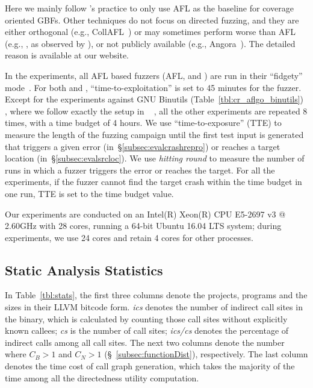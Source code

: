 Here we mainly follow \aflgo's practice to only use AFL as the baseline for coverage oriented GBFs. Other techniques do not focus on directed fuzzing, and they are either orthogonal (e.g., CollAFL~\cite{CollAFL}) or may sometimes perform worse than AFL (e.g., \aflfast, as observed by \cite{Shastry:LNCS2017:Orthrus}), or not publicly available (e.g., Angora~\cite{Angora}). The detailed reason is available at our website. %

In the experiments, all AFL based fuzzers (AFL, {\aflgo} and {\dGO}) are run in their ``fidgety'' mode~\cite{FidgetyAFL}. For both {\aflgo} and {\dGO}, ``time-to-exploitation'' is set to 45 minutes for the fuzzer. Except for the experiments against GNU Binutils (Table~\ref{tbl:cr_aflgo_binutils}) , where we follow exactly the setup in {\aflgo}~\cite{Bohme:2017:DGF} , all the other experiments are repeated 8 times, with a time budget of 4 hours. 
We use ``time-to-exposure'' (TTE) to measure the length of the
fuzzing campaign until the first test input is generated that triggers a given error (in~\S\ref{subsec:evalcrashrepro}) or reaches a target location (in~\S\ref{subsec:evalsrcloc}).
We use \emph{hitting round} to measure the number of runs in which a fuzzer triggers the error or reaches the target.
For all the experiments, if the fuzzer cannot find the target crash within the time budget in one run, TTE is set to the time budget value. 

Our experiments are conducted on an Intel(R) Xeon(R) CPU E5-2697 v3 @ 2.60GHz with 28 cores, running a 64-bit Ubuntu 16.04 LTS system; during experiments, we use 24 cores and retain 4 cores for other processes. 


\subsection{Static Analysis Statistics}\label{subsec:evalstatic}


In Table~\ref{tbl:stats}, the first three columns denote the projects, programs and the sizes in their LLVM bitcode form. \emph{ics} denotes the number of indirect call sites in the binary, which is calculated by counting those call sites without explicitly known callees; \emph{cs} is the number of call sites; \emph{ics/cs} denotes the percentage of indirect calls among all call sites. 
The next two columns denote the number where $C_B>1$ and $C_N>1$ (\S~\ref{subsec:functionDist}), respectively. The last column denotes the time cost of call graph generation, which takes the majority of the time among all the directedness utility computation.



